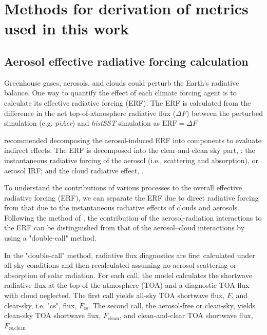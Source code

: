 \section{Methods for derivation of metrics used in this work}
\label{ch2:sec:defs_terms}

\subsection{Aerosol effective radiative forcing calculation}
\label{sec:ch2:erf}


Greenhouse gases, aerosols, and clouds could perturb the Earth's radiative balance. One way to quantify the effect of each climate forcing agent is to calculate its effective radiative forcing (ERF). The ERF is calculated from the difference in the net top-of-atmosphere radiative flux ($\Delta F$) between the perturbed simulation (e.g. \textit{piAer}) and \textit{histSST} simulation as  $\text{ERF} = \Delta F$

\citet{ghanTechnicalNoteEstimating2013} recommended decomposing the aerosol-induced ERF into components to evaluate indirect effects. The ERF is decomposed into the clear-and-clean sky part, \ERFcsclean{}; the instantaneous radiative forcing of the aerosol (i.e., scattering and absorption), or aerosol IRF; and the cloud radiative effect, \dcre{}. 

To understand the contributions of various processes to the overall effective radiative forcing (ERF), we can separate the ERF due to direct radiative forcing from that due to the instantaneous radiative effects of clouds and aerosols. Following the method of \citet{ghanTechnicalNoteEstimating2013}, the contribution of the aerosol-radiation interactions to the ERF can be distinguished from that of the aerosol–cloud interactions by using a "double-call" method.

In the "double-call" method, radiative flux diagnostics are first calculated under all-sky conditions and then recalculated assuming no aerosol scattering or absorption of solar radiation. For each call, the model calculates the shortwave radiative flux at the top of the atmosphere (TOA) and a diagnostic TOA flux with cloud neglected. The first call yields all-sky TOA shortwave flux, $F$, and clear-sky, i.e. "cs", flux, $F_{\text{cs}}$. The second call, the aerosol-free or clean-sky, yields clean-sky TOA shortwave flux, $F_{\text{clean}}$, and clean-and-clear TOA shortwave flux, $F_{\text{cs,clean}}$.

